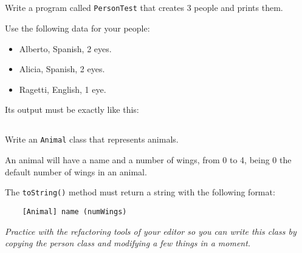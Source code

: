 \documentclass[a4paper, 11pt]{article}
\begin{document}








\subsection{}

Write a program called \verb+PersonTest+ that creates 3 people and prints them.

Use the following data for your people:

\begin{itemize}

  \item Alberto, Spanish, 2 eyes.

  \item Alicia, Spanish, 2 eyes.

  \item Ragetti, English, 1 eye.

\end{itemize}

Its output must be exactly like this:







\subsection{}

Write an \verb+Animal+ class that represents animals.

An animal will have a name and a number of wings, from 0 to 4, being 0 the
default number of wings in an animal.

The \verb+toString()+ method must return a string with the following
format:

\verb+    [Animal] name (numWings)+

\textsl{Practice with the refactoring tools of your editor so you can write
this class by copying the person class and modifying a few things in a
moment.}

\end{document}
